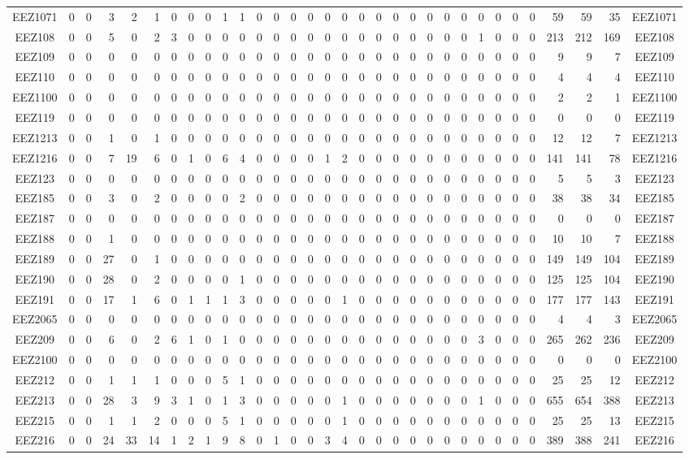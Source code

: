 \documentclass[10pt,a4paper,twoside]{report}
\begin{document}
{\begin{tabular}{crrrrrrrrrrrrrrrrrrrrrrrrrrrrrrc}
EEZ1071&0&0&3&2&1&0&0&0&1&1&0&0&0&0&0&0&0&0&0&0&0&0&0&0&0&0&0&59&59&35&EEZ1071\\
EEZ108&0&0&5&0&2&3&0&0&0&0&0&0&0&0&0&0&0&0&0&0&0&0&0&1&0&0&0&213&212&169&EEZ108\\
EEZ109&0&0&0&0&0&0&0&0&0&0&0&0&0&0&0&0&0&0&0&0&0&0&0&0&0&0&0&9&9&7&EEZ109\\
EEZ110&0&0&0&0&0&0&0&0&0&0&0&0&0&0&0&0&0&0&0&0&0&0&0&0&0&0&0&4&4&4&EEZ110\\
EEZ1100&0&0&0&0&0&0&0&0&0&0&0&0&0&0&0&0&0&0&0&0&0&0&0&0&0&0&0&2&2&1&EEZ1100\\
EEZ119&0&0&0&0&0&0&0&0&0&0&0&0&0&0&0&0&0&0&0&0&0&0&0&0&0&0&0&0&0&0&EEZ119\\
EEZ1213&0&0&1&0&1&0&0&0&0&0&0&0&0&0&0&0&0&0&0&0&0&0&0&0&0&0&0&12&12&7&EEZ1213\\
EEZ1216&0&0&7&19&6&0&1&0&6&4&0&0&0&0&1&2&0&0&0&0&0&0&0&0&0&0&0&141&141&78&EEZ1216\\
EEZ123&0&0&0&0&0&0&0&0&0&0&0&0&0&0&0&0&0&0&0&0&0&0&0&0&0&0&0&5&5&3&EEZ123\\
EEZ185&0&0&3&0&2&0&0&0&0&2&0&0&0&0&0&0&0&0&0&0&0&0&0&0&0&0&0&38&38&34&EEZ185\\
EEZ187&0&0&0&0&0&0&0&0&0&0&0&0&0&0&0&0&0&0&0&0&0&0&0&0&0&0&0&0&0&0&EEZ187\\
EEZ188&0&0&1&0&0&0&0&0&0&0&0&0&0&0&0&0&0&0&0&0&0&0&0&0&0&0&0&10&10&7&EEZ188\\
EEZ189&0&0&27&0&1&0&0&0&0&0&0&0&0&0&0&0&0&0&0&0&0&0&0&0&0&0&0&149&149&104&EEZ189\\
EEZ190&0&0&28&0&2&0&0&0&0&1&0&0&0&0&0&0&0&0&0&0&0&0&0&0&0&0&0&125&125&104&EEZ190\\
EEZ191&0&0&17&1&6&0&1&1&1&3&0&0&0&0&0&1&0&0&0&0&0&0&0&0&0&0&0&177&177&143&EEZ191\\
EEZ2065&0&0&0&0&0&0&0&0&0&0&0&0&0&0&0&0&0&0&0&0&0&0&0&0&0&0&0&4&4&3&EEZ2065\\
EEZ209&0&0&6&0&2&6&1&0&1&0&0&0&0&0&0&0&0&0&0&0&0&0&0&3&0&0&0&265&262&236&EEZ209\\
EEZ2100&0&0&0&0&0&0&0&0&0&0&0&0&0&0&0&0&0&0&0&0&0&0&0&0&0&0&0&0&0&0&EEZ2100\\
EEZ212&0&0&1&1&1&0&0&0&5&1&0&0&0&0&0&0&0&0&0&0&0&0&0&0&0&0&0&25&25&12&EEZ212\\
EEZ213&0&0&28&3&9&3&1&0&1&3&0&0&0&0&0&1&0&0&0&0&0&0&0&1&0&0&0&655&654&388&EEZ213\\
EEZ215&0&0&1&1&2&0&0&0&5&1&0&0&0&0&0&1&0&0&0&0&0&0&0&0&0&0&0&25&25&13&EEZ215\\
EEZ216&0&0&24&33&14&1&2&1&9&8&0&1&0&0&3&4&0&0&0&0&0&0&0&0&0&0&0&389&388&241&EEZ216\\

\end{tabular}}
\end{document}
